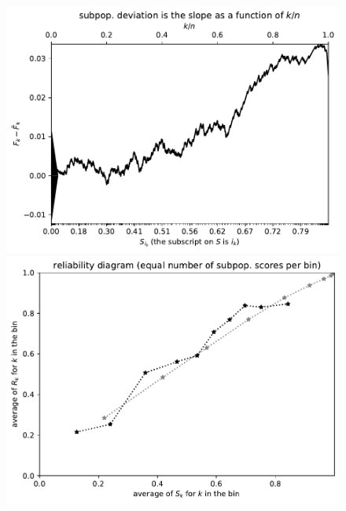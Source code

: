 \documentclass{article}
\begin{document}
\begin{figure}
\begin{centering}

\parbox{\imsize}{\includegraphics[width=\imsize]
{./codes/unweighted/prob-1-837-sunglasses-dark-glasses-shades}}
\quad\quad
\parbox{\imsize}{\includegraphics[width=\imsize]
{./codes/unweighted/prob-1-837-sunglasses-dark-glasses-shadesequisamps10}}

\vspace{\vertsep}


\end{centering}
\end{figure}
\end{document}
